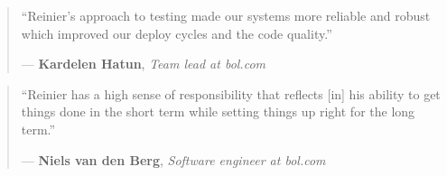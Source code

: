 \documentclass[a4paper,10pt]{article}
\begin{document}
            \begin{quote}
              “Reinier’s approach to testing made our systems more reliable and robust which improved our deploy cycles and the code quality.”

              — \textbf{Kardelen Hatun}, \textit{Team lead at bol.com}
            \end{quote}

            \begin{quote}
              “Reinier has a high sense of responsibility that reflects [in] his ability to get things done in the short term while setting things up right for the long term.”

              — \textbf{Niels van den Berg}, \textit{Software engineer at bol.com}
            \end{quote}
\end{document}

